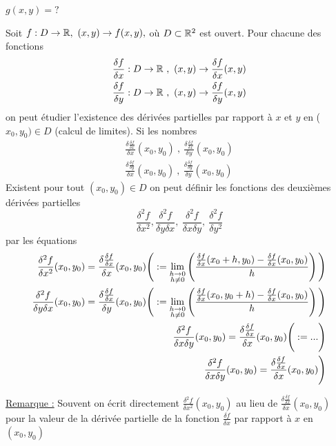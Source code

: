 \documentclass[12pt,a4paper]{article}
\begin{document}
$g(x,y) = ?$\\
\begin{boite}
	 Soit $f: D\to \mathbb{R},\ (x,y) \to f(x,y),$ où $D\subset \mathbb{R}^2$ est ouvert. Pour chacune des fonctions
	\begin{align*}
		\frac{\delta f}{\delta x} : D\to \mathbb{R}\ , \ (x,y) \to \frac{\delta f}{\delta x} (x,y)\\
		\frac{\delta f}{\delta y} : D\to \mathbb{R}\ , \ (x,y) \to \frac{\delta f}{\delta y} (x,y)
	\end{align*}
	on peut étudier l'existence des dérivées partielles par rapport à $x$ et $y$ en ($x_0,y_0) \in D$ (calcul de limites). Si les nombres 
	\begin{align*}
	\frac{\delta \frac{\delta f}{\delta x}}{\delta x}(x_0,y_0) \ , \ \frac{\delta \frac{\delta f}{\delta x}}{\delta y}(x_0,y_0)\\
	\frac{\delta \frac{\delta f}{\delta y}}{\delta x}(x_0,y_0) \ , \ \frac{\delta \frac{\delta f}{\delta y}}{\delta y}(x_0,y_0)
	\end{align*}
	Existent pour tout $(x_0,y_0) \in D$ on peut définir les fonctions des deuxièmes dérivées partielles 
	\begin{equation*}
		\frac{\delta^2 f}{\delta x^2},\frac{\delta^2 f}{\delta y \delta x},\ \frac{\delta^2 f}{\delta x \delta y},\ \frac{\delta^2 f}{\delta y^2}
	\end{equation*}
	par les équations 
	\begin{align*}
		\frac{\delta^2 f}{\delta x^2} (x_0,y_0) = \frac{\delta \frac{\delta f}{\delta x}}{\delta x}(x_0,y_0)\Bigg( := \lim\limits_{\substack{h\to 0 \\ h\neq 0}}\left(\frac{\frac{\delta f}{\delta x} (x_0+h, y_0) - \frac{\delta f}{\delta x} (x_0,y_0)}{h}\right)\Bigg)\\
		\frac{\delta^2 f}{\delta y \delta x } (x_0,y_0) = \frac{\delta \frac{\delta f}{\delta x}}{\delta y}(x_0,y_0)\Bigg( := \lim\limits_{\substack{h\to 0 \\ h\neq 0}}\left(\frac{\frac{\delta f}{\delta x} (x_0, y_0+h) - \frac{\delta f}{\delta x} (x_0,y_0)}{h}\right)\Bigg)\\
		\frac{\delta^2 f}{\delta x \delta y} (x_0,y_0) = \frac{\delta \frac{\delta f}{\delta x}}{\delta x}(x_0,y_0)\Bigg( := ...\Bigg)\\
		\frac{\delta^2 f}{\delta x \delta y} (x_0,y_0) = \frac{\delta \frac{\delta f}{\delta x}}{\delta x}(x_0,y_0)\Bigg)
	\end{align*}
\end{boite}
\begin{boite}
	\underline{Remarque :} Souvent on écrit directement $\frac{\delta^2 f}{\delta x^2}(x_0,y_0)$ au lieu de $\frac{\delta \frac{\delta f}{\delta x}}{\delta x}(x_0,y_0)$ pour la valeur de la dérivée partielle de la fonction $\frac{\delta f}{\delta x}$ par rapport à $x$ en $(x_0,y_0)$
\end{boite}
\end{document}
